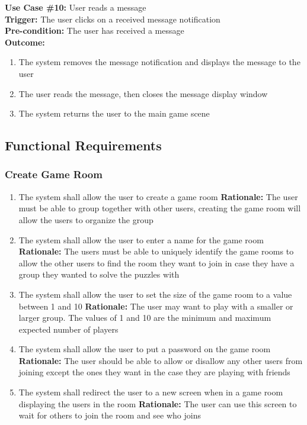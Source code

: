 \documentclass[12pt]{article}
\begin{document}
\textbf{Use Case \#10:} User reads a message\\
\textbf{Trigger:} The user clicks on a received message notification\\
\textbf{Pre-condition:} The user has received a message\\
\textbf{Outcome:}
\begin{enumerate}
        \item The system removes the message notification and displays the message to the user
	\item The user reads the message, then closes the message display window
	\item The system returns the user to the main game scene
\end{enumerate}

\subsection{Functional Requirements}
\subsubsection{Create Game Room}
\begin{enumerate}[label=CG\arabic*., series=CreateGame]
    \item The system shall allow the user to create a game room \newline 
    \textbf{Rationale:} The user must be able to group together with other users, creating the game room will allow the users to organize the group
    \item The system shall allow the user to enter a name for the game room \newline
    \textbf{Rationale:} The users must be able to uniquely identify the game rooms to allow the other users to find the room they want to join in case they have a group they wanted to solve the puzzles with
    \item The system shall allow the user to set the size of the game room to a value between 1 and 10 \newline
    \textbf{Rationale:} The user may want to play with a smaller or larger group. The values of 1 and 10 are the minimum and maximum expected number of players
    \item The system shall allow the user to put a password on the game room \newline
    \textbf{Rationale:} The user should be able to allow or disallow any other users from joining except the ones they want in the case they are playing with friends
    \item The system shall redirect the user to a new screen when in a game room displaying the users in the room\newline
    \textbf{Rationale: } The user can use this screen to wait for others to join the room and see who joins
\end{enumerate}
\end{document}

